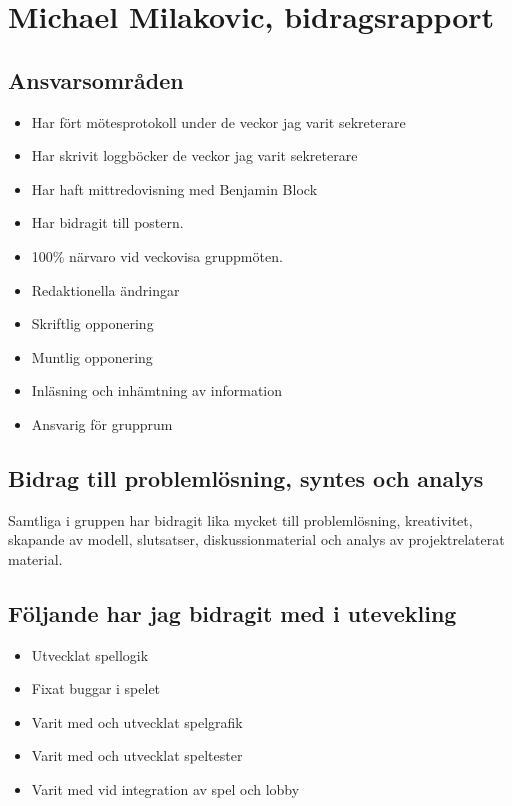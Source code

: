 \section{Michael Milakovic, bidragsrapport}
\subsection{Ansvarsområden}
\begin{itemize}
    \item Har fört mötesprotokoll under de veckor jag varit sekreterare
    \item Har skrivit loggböcker de veckor jag varit sekreterare
    \item Har haft mittredovisning med Benjamin Block
    \item Har bidragit till postern.
    \item 100\% närvaro vid veckovisa gruppmöten. 
    \item Redaktionella ändringar
    \item Skriftlig opponering
    \item Muntlig opponering
    \item Inläsning och inhämtning av information
    \item Ansvarig för grupprum
\end{itemize}

\subsection{Bidrag till problemlösning, syntes och analys}
Samtliga i gruppen har bidragit lika mycket till problemlösning, kreativitet, skapande av modell, slutsatser, diskussionmaterial och analys av projektrelaterat material. 


\subsection{Följande har jag bidragit med i utevekling}
\begin{itemize}
  \item Utvecklat spellogik
  \item Fixat buggar i spelet
  \item Varit med och utvecklat spelgrafik
  \item Varit med och utvecklat speltester
  \item Varit med vid integration av spel och lobby
\end{itemize}

